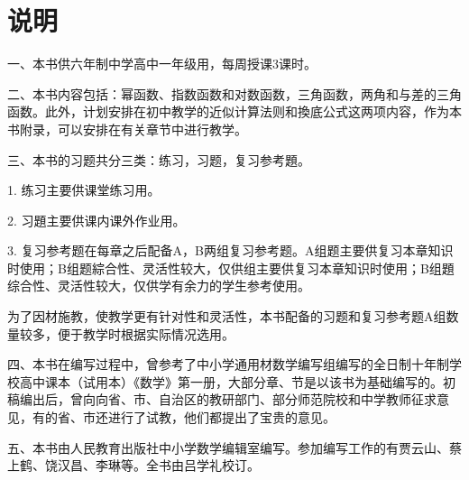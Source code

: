 
\chapter{说明}

一、本书供六年制中学高中一年级用，每周授课3课时。

二、本书内容包括：幂函数、指数函数和对数函数，三角函数，两角和与差的三角函数。此外，计划安排在初中教学的近似计算法则和換底公式这两项内容，作为本书附录，可以安排在有关章节中进行教学。

三、本书的习题共分三类：练习，习题，复习参考題。

1. 练习\quad 主要供课堂练习用。

2. 习題\quad 主要供课内课外作业用。

3. 复习参考题\quad 在每章之后配备A，B两组复习参考题。A组题主要供复习本章知识时使用；B组题綜合性、灵活性较大，仅供组主要供复习本章知识时使用；B组題综合性、灵活性较大，仅供学有余力的学生参考使用。

为了因材施教，使教学更有针对性和灵活性，本书配备的习题和复习参考题A组数量较多，便于教学时根据实际情况选用。

四、本书在编写过程中，曾参考了中小学通用材数学编写组编写的全日制十年制学校高中课本（试用本）《数学》第一册，大部分章、节是以该书为基础编写的。初稿编出后，曾向向省、市、自治区的教研部门、部分师范院校和中学教师征求意见，有的省、市还进行了试教，他们都提出了宝贵的意见。

五、本书由人民教育出版社中小学数学编辑室编写。参加编写工作的有贾云山、蔡上鹤、饶汉昌、李琳等。全书由吕学礼校订。

